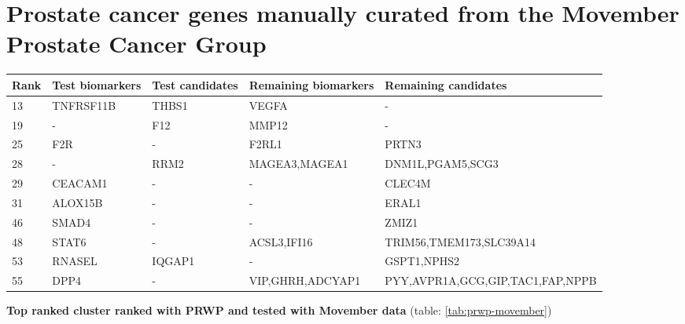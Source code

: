 \section{Prostate cancer genes manually curated from the Movember Prostate Cancer Group}
\begin{sidewaystable}
    \begin{tabular}{|l|l|l|l|l|}
        \hline
        \textbf{Rank}
        & \textbf{Test biomarkers}
        & \textbf{Test candidates}
        & \textbf{Remaining biomarkers}
        & \textbf{Remaining candidates} \\
        \hline
        13	& TNFRSF11B	& THBS1	& VEGFA	& - \\
        \hline
        19	& -	& F12	& MMP12	& - \\
        \hline
        25	& F2R	& -	& F2RL1	& PRTN3 \\
        \hline
        28	& -	& RRM2	& MAGEA3,MAGEA1	& DNM1L,PGAM5,SCG3 \\
        \hline
        29	& CEACAM1	& -	& -	& CLEC4M \\
        \hline
        31	& ALOX15B	& -	& -	& ERAL1 \\
        \hline
        46	& SMAD4	& -	& -	& ZMIZ1 \\
        \hline
        48	& STAT6	& -	& ACSL3,IFI16	& TRIM56,TMEM173,SLC39A14 \\
        \hline
        53	& RNASEL	& IQGAP1	& -	& GSPT1,NPHS2 \\
        \hline
        55	& DPP4	& -	& VIP,GHRH,ADCYAP1	& PYY,AVPR1A,GCG,GIP,TAC1,FAP,NPPB \\
        \hline
    \end{tabular}
    \caption{iRefWeb network ranked with PRWP and movember data - matched 254 
    test genes from movember data set out of 271 possible}
    \label{tab:prwp-movember}
\end{sidewaystable}

\textbf{Top ranked cluster ranked with PRWP and tested with Movember data}
(table: \ref{tab:prwp-movember})

